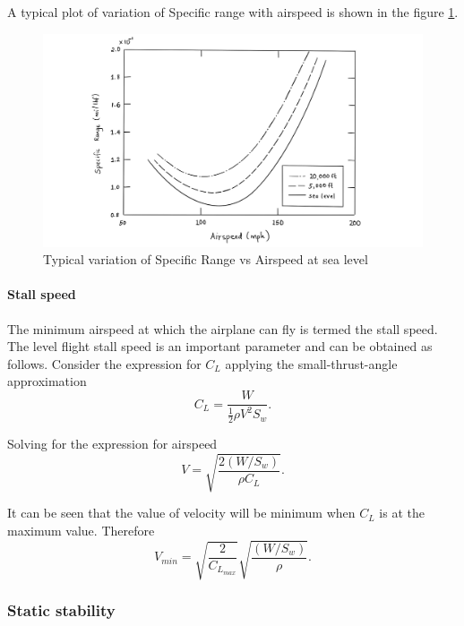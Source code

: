 \documentclass[letterpaper,12pt]{article}
\begin{document}
A typical plot of variation of Specific range with airspeed is shown in the figure \ref{SRvsV}.
\begin{figure}[H]
\includegraphics[scale=0.3]{plot_range}
\centering
\caption{Typical variation of Specific Range vs Airspeed at sea level}
\label{SRvsV}
\end{figure}

\paragraph{Stall speed}
The minimum airspeed at which the airplane can fly is termed the stall speed. The level flight stall speed is an important parameter and can be obtained as follows. Consider the expression for $C_L$ applying the small-thrust-angle approximation
\begin{equation}
C_L=\frac{W}{\frac{1}{2}\rho V^2S_w}.
\end{equation}

Solving for the expression for airspeed
\begin{equation}
V=\sqrt{\frac{2(W/S_w)}{\rho C_L}}.
\end{equation}

It can be seen that the value of velocity will be minimum when $C_L$ is at the maximum value. Therefore
\begin{equation}
\boxed{
V_{min}=\sqrt{\frac{2}{C_{L_{max}}}}\sqrt{\frac{(W/S_w)}{\rho}}.
}
\label{vmin}
\end{equation}


\subsubsection{Static stability}
\end{document}
